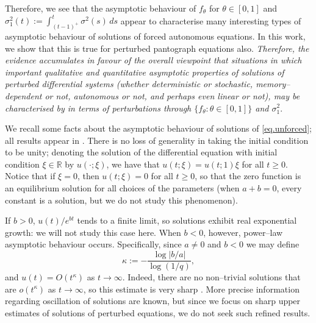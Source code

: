 \documentclass[a4paper,10pt,reqno]{amsart}
\numberwithin{equation}{section}
\theoremstyle{definition}
\theoremstyle{remark}
\DeclareMathOperator{\1}{\mathbbm 1}
\begin{document}
	Therefore, we see that the asymptotic behaviour of $f_\theta$ for $\theta\in [0,1]$ and $\sigma^2_1(t):=\int_{(t-1)^+}^t \sigma^2(s)\,ds$ appear to characterise many interesting types of asymptotic behaviour of solutions of forced autonomous equations. In this work, we show that this is true for perturbed pantograph equations also. \textit{Therefore, the evidence accumulates in favour of the overall viewpoint that situations in which important qualitative and quantitative asymptotic properties of solutions of perturbed differential systems (whether deterministic or stochastic, memory--dependent or not, autonomous or not, and perhaps even linear or not), may be characterised by in terms of perturbations through $\{f_\theta:\theta\in [0,1]\}$ and $\sigma^2_1$}.  
	
	
	We recall some facts about the asymptotic behaviour of solutions of  \eqref{eq.unforced}; all results appear in \cite{KatoMc}. There is no loss of generality in taking the initial condition to be unity; denoting the solution of the differential equation with initial condition $\xi\in \mathbb{R}$ by $u(\cdot;\xi)$, we have that 
	$u(t;\xi)=u(t;1)\xi$ for all $t\geq 0$. Notice that if $\xi=0$, then $u(t;\xi)=0$ for all $t\geq 0$, so that the zero function is an equilibrium solution for all choices of the parameters (when $a+b=0$, every constant is a solution, but we do not study this phenomenon). 
	
	If $b>0$, $u(t)/e^{bt}$ tends to a finite limit, so solutions exhibit real exponential growth: we will not study this case here. When $b<0$, however, power--law asymptotic behaviour occurs. Specifically, since $a\neq 0$ and $b<0$ we may define 
	\begin{equation} \label{eq.kappa}
		\kappa:=-\frac{\log|b/a|}{\log(1/q)},
	\end{equation}
	and $u(t)=O(t^\kappa)$ as $t\to\infty$. Indeed, there are no non--trivial solutions that are $o(t^\kappa)$ as $t\to\infty$, so this estimate is very sharp \cite[Theorem 3]{KatoMc}. More precise information regarding oscillation of solutions are known, but since we focus on sharp upper estimates of solutions of perturbed equations, we do not seek such refined results. 
	
\end{document}
